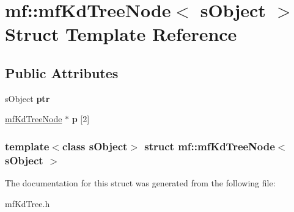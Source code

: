 \hypertarget{structmf_1_1mfKdTreeNode}{
\section{mf::mfKdTreeNode$<$ sObject $>$ Struct Template Reference}
\label{structmf_1_1mfKdTreeNode}
}
\subsection*{Public Attributes}
\begin{DoxyCompactItemize}
\item 
\hypertarget{structmf_1_1mfKdTreeNode_aa586026f4826ae7ad48607f3b89ead0c}{
sObject {\bfseries ptr}}
\label{structmf_1_1mfKdTreeNode_aa586026f4826ae7ad48607f3b89ead0c}

\item 
\hypertarget{structmf_1_1mfKdTreeNode_a6e7b460c40df90703d89ab771cec182a}{
\hyperlink{structmf_1_1mfKdTreeNode}{mfKdTreeNode} $\ast$ {\bfseries p} \mbox{[}2\mbox{]}}
\label{structmf_1_1mfKdTreeNode_a6e7b460c40df90703d89ab771cec182a}

\end{DoxyCompactItemize}
\subsubsection*{template$<$class sObject$>$ struct mf::mfKdTreeNode$<$ sObject $>$}



The documentation for this struct was generated from the following file:\begin{DoxyCompactItemize}
\item 
mfKdTree.h\end{DoxyCompactItemize}
